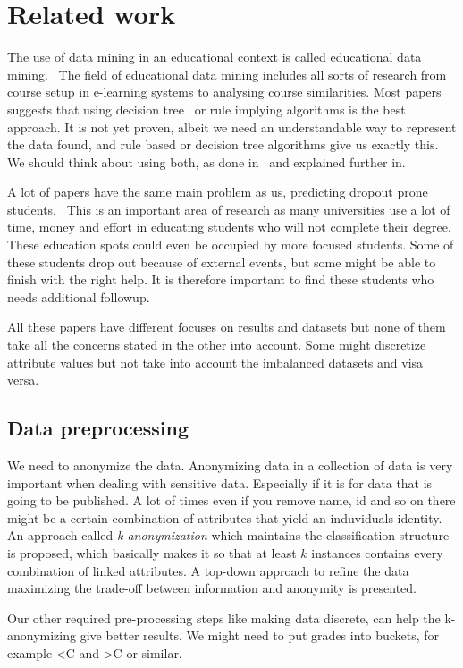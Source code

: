 \section{Related work}
The use of data mining in an educational context is called educational data mining.~\cite{1}
The field of educational data mining includes all sorts of research from course setup in e-learning systems to analysing course similarities. 
Most papers suggests that using decision tree~\cite{2} or rule implying algorithms is the best approach. 
It is not yet proven, albeit we need an understandable way to represent the data found, and rule based or decision tree algorithms give us exactly this. 
We should think about using both, as done in~\cite{3} and explained further in.~\cite{4}

\bigskip\noindent
A lot of papers have the same main problem as us, predicting dropout prone students.~\cite{5,7,8,9,11} 
This is an important area of research as many universities use a lot of time, 
money and effort in educating students who will not complete their degree. 
These education spots could even be occupied by more focused students. 
Some of these students drop out because of external events, but some might be able to finish with the right help. 
It is therefore important to find these students who needs additional followup. 

\bigskip\noindent
All these papers have different focuses on results and datasets but none of them take all the concerns stated in the other into account. 
Some might discretize attribute values but not take into account the imbalanced datasets and visa versa.

\subsection{Data preprocessing}
We need to anonymize the data. 
Anonymizing data in a collection of data is very important when dealing with sensitive data. 
Especially if it is for data that is going to be published. 
A lot of times even if you remove name, id and so on there might be a certain combination of attributes that yield an induviduals identity.
An approach called \textit{k-anonymization} which maintains the classification structure is proposed, 
which basically makes it so that at least $k$ instances contains every combination of linked attributes. 
A top-down approach to refine the data maximizing the trade-off between information and anonymity is presented.~\cite{14}

\bigskip\noindent
Our other required pre-processing steps like making data discrete, can help the k-anonymizing give better results. 
We might need to put grades into buckets, for example \textless C and \textgreater C or similar.~\cite{12}

